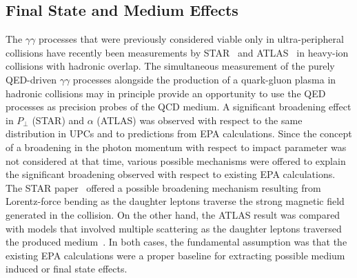 \documentclass[twocolumn,epjc3]{svjour3}\sloppy
\begin{document}
\subsection{Final State and Medium Effects}
The $\gamma\gamma$ processes that were previously considered viable only in ultra-peripheral collisions have recently been measurements by STAR~\cite{starcollaborationProductionEnsuremathPairs2004} and ATLAS~\cite{atlascollaborationObservationCentralitydependentAcoplanarity2018} in heavy-ion collisions with hadronic overlap. 
The simultaneous measurement of the purely QED-driven $\gamma\gamma$ processes alongside the production of a quark-gluon plasma in hadronic collisions may in principle provide an opportunity to use the QED processes as precision probes of the QCD medium.
A significant broadening effect in $P_\perp$ (STAR) and $\alpha$ (ATLAS) was observed with respect to the same distribution in UPCs and to predictions from EPA calculations.
Since the concept of a broadening in the photon momentum with respect to impact parameter was not considered at that time, various possible mechanisms were offered to explain the significant broadening observed with respect to existing EPA calculations.
The STAR paper~\cite{starcollaborationProductionEnsuremathPairs2004} offered a possible broadening mechanism resulting from Lorentz-force bending as the daughter leptons traverse the strong magnetic field generated in the collision.
On the other hand, the ATLAS result was compared with models that involved multiple scattering as the daughter leptons traversed the produced medium~\cite{atlascollaborationObservationCentralityDependentAcoplanarity2018a}.
In both cases, the fundamental assumption was that the existing EPA calculations were a proper baseline for extracting possible medium induced or final state effects.
\end{document}
